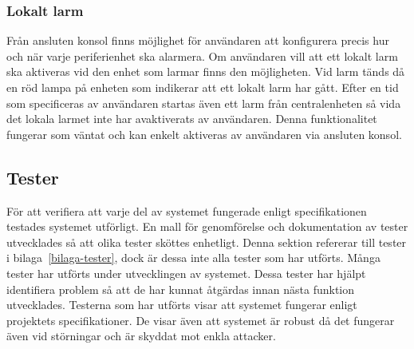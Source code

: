 \documentclass[a4paper]{article}
\begin{document}
\subsubsection{Lokalt larm}
Från ansluten konsol finns möjlighet för användaren att konfigurera precis hur och när varje periferienhet ska alarmera.
Om användaren vill att ett lokalt larm ska aktiveras vid den enhet som larmar finns den möjligheten.
Vid larm tänds då en röd lampa på enheten som indikerar att ett lokalt larm har gått.
Efter en tid som specificeras av användaren startas även ett larm från centralenheten så vida det lokala larmet inte har avaktiverats av användaren.
Denna funktionalitet fungerar som väntat och kan enkelt aktiveras av användaren via ansluten konsol.

\subsection{Tester}
För att verifiera att varje del av systemet fungerade enligt specifikationen testades systemet utförligt.
En mall för genomförelse och dokumentation av tester utvecklades så att olika tester sköttes enhetligt.
Denna sektion refererar till tester i bilaga~\ref{bilaga-tester}, dock är dessa inte alla tester som har utförts.
Många tester har utförts under utvecklingen av systemet.
Dessa tester har hjälpt identifiera problem så att de har kunnat åtgärdas innan nästa funktion utvecklades.
Testerna som har utförts visar att systemet fungerar enligt projektets specifikationer.
De visar även att systemet är robust då det fungerar även vid störningar och är skyddat mot enkla attacker.

\end{document}
